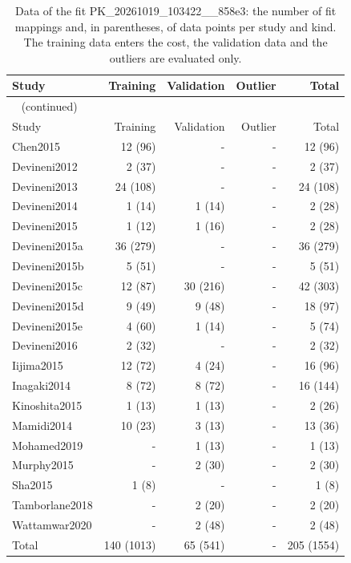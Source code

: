 \begin{longtable}{lrrrr}
\caption{Data of the fit PK\_20261019\_103422\_\_858e3: the number of fit mappings and, in parentheses, of data points per study and kind. The training data enters the cost, the validation data and the outliers are evaluated only.}\label{tab:data:PK_20261019_103422__858e3} \\
\toprule
Study & Training & Validation & Outlier & Total \\
\midrule
\endfirsthead
\multicolumn{5}{l}{\small\tablename~\thetable{} (continued)} \\
\toprule
Study & Training & Validation & Outlier & Total \\
\midrule
\endhead
\bottomrule
\endlastfoot
Chen2015 & 12 (96) & - & - & 12 (96) \\
Devineni2012 & 2 (37) & - & - & 2 (37) \\
Devineni2013 & 24 (108) & - & - & 24 (108) \\
Devineni2014 & 1 (14) & 1 (14) & - & 2 (28) \\
Devineni2015 & 1 (12) & 1 (16) & - & 2 (28) \\
Devineni2015a & 36 (279) & - & - & 36 (279) \\
Devineni2015b & 5 (51) & - & - & 5 (51) \\
Devineni2015c & 12 (87) & 30 (216) & - & 42 (303) \\
Devineni2015d & 9 (49) & 9 (48) & - & 18 (97) \\
Devineni2015e & 4 (60) & 1 (14) & - & 5 (74) \\
Devineni2016 & 2 (32) & - & - & 2 (32) \\
Iijima2015 & 12 (72) & 4 (24) & - & 16 (96) \\
Inagaki2014 & 8 (72) & 8 (72) & - & 16 (144) \\
Kinoshita2015 & 1 (13) & 1 (13) & - & 2 (26) \\
Mamidi2014 & 10 (23) & 3 (13) & - & 13 (36) \\
Mohamed2019 & - & 1 (13) & - & 1 (13) \\
Murphy2015 & - & 2 (30) & - & 2 (30) \\
Sha2015 & 1 (8) & - & - & 1 (8) \\
Tamborlane2018 & - & 2 (20) & - & 2 (20) \\
Wattamwar2020 & - & 2 (48) & - & 2 (48) \\
Total & 140 (1013) & 65 (541) & - & 205 (1554) \\
\end{longtable}


